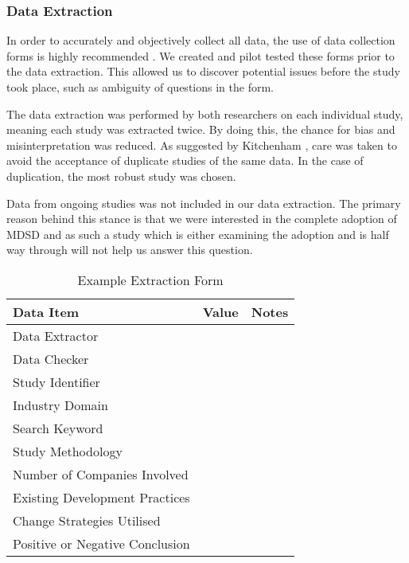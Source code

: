 \documentclass[10pt,twocolumn]{article}
\begin{document}

\subsubsection{Data Extraction}

In order to accurately and objectively collect all data, the use of data collection forms is highly recommended \cite{kitchenham2007guidelines}. We created and pilot tested these forms prior to the data extraction. This allowed us to discover potential issues before the study took place, such as ambiguity of questions in the form.

The data extraction was performed by both researchers on each individual study, meaning each study was extracted twice. By doing this, the chance for bias and misinterpretation was reduced. As suggested by Kitchenham \cite{kitchenham2007guidelines}, care was taken to avoid the acceptance of duplicate studies of the same data. In the case of duplication, the most robust study was chosen.

Data from ongoing studies was not included in our data extraction. The primary reason behind this stance is that we were interested in the complete adoption of MDSD and as such a study which is either examining the adoption and is half way through will not help us answer this question.

\begin{table}[ht]
	\centering
	\begin{tabular}{|l|l|l|} 
		\hline
		\textbf{Data Item} & \textbf{Value} & \textbf{Notes}  \\
		\hline
		Data Extractor &  &  \\
		\hline
		Data Checker &  & \\
		\hline
		Study Identifier &  & \\
		\hline
		Industry Domain & & \\
		\hline
		Search Keyword &  & \\
		\hline
		Study Methodology & & \\
		\hline
		Number of Companies Involved &  & \\
		\hline
		Existing Development Practices & & \\
		\hline
		Change Strategies Utilised & & \\
		\hline
		Positive or Negative Conclusion & & \\
		\hline
	\end{tabular}
	\caption{Example Extraction Form}
\end{table}
\end{document}
